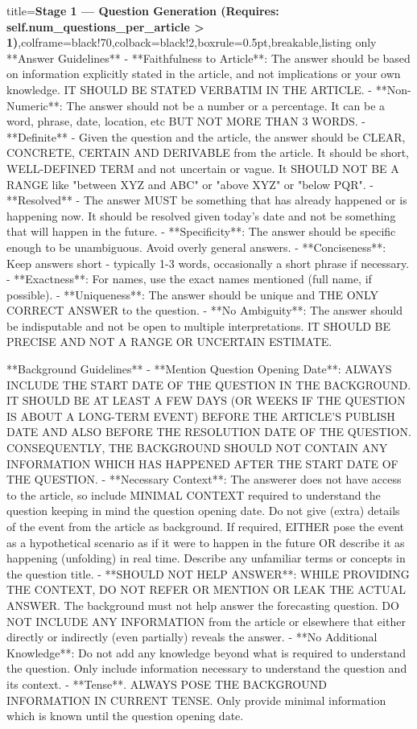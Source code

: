 \begin{tcblisting}{title={\textbf{Stage 1 --- Question Generation (Requires:  self.num\_questions\_per\_article > 1)}},colframe=black!70,colback=black!2,boxrule=0.5pt,breakable,listing only}
**Answer Guidelines**
- **Faithfulness to Article**: The answer should be based on information explicitly stated in the article, and not implications or your own knowledge. IT SHOULD BE STATED VERBATIM IN THE ARTICLE.
- **Non-Numeric**: The answer should not be a number or a percentage. It can be a word, phrase, date, location, etc BUT NOT MORE THAN 3 WORDS.
- **Definite** - Given the question and the article, the answer should be CLEAR, CONCRETE, CERTAIN AND DERIVABLE from the article. It should be short, WELL-DEFINED TERM and not uncertain or vague. It SHOULD NOT BE A RANGE like "between XYZ and ABC" or "above XYZ" or "below PQR".
- **Resolved** - The answer MUST be something that has already happened or is happening now. It should be resolved given today's date and not be something that will happen in the future.
- **Specificity**: The answer should be specific enough to be unambiguous. Avoid overly general answers.
- **Conciseness**: Keep answers short - typically 1-3 words, occasionally a short phrase if necessary.
- **Exactness**: For names, use the exact names mentioned (full name, if possible).
- **Uniqueness**: The answer should be unique and THE ONLY CORRECT ANSWER to the question. 
- **No Ambiguity**: The answer should be indisputable and not be open to multiple interpretations. IT SHOULD BE PRECISE AND NOT A RANGE OR UNCERTAIN ESTIMATE.

**Background Guidelines**
- **Mention Question Opening Date**: ALWAYS INCLUDE THE START DATE OF THE QUESTION IN THE BACKGROUND. IT SHOULD BE AT LEAST A FEW DAYS (OR WEEKS IF THE QUESTION IS ABOUT A LONG-TERM EVENT) BEFORE THE ARTICLE'S PUBLISH DATE AND ALSO BEFORE THE RESOLUTION DATE OF THE QUESTION. CONSEQUENTLY, THE BACKGROUND SHOULD NOT CONTAIN ANY INFORMATION WHICH HAS HAPPENED AFTER THE START DATE OF THE QUESTION.
- **Necessary Context**: The answerer does not have access to the article, so include MINIMAL CONTEXT required to understand the question keeping in mind the question opening date. Do not give (extra) details of the event from the article as background. If required, EITHER pose the event as a hypothetical scenario as if it were to happen in the future OR describe it as happening (unfolding) in real time. Describe any unfamiliar terms or concepts in the question title. 
- **SHOULD NOT HELP ANSWER**: WHILE PROVIDING THE CONTEXT, DO NOT REFER OR MENTION OR LEAK THE ACTUAL ANSWER. The background must not help answer the forecasting question. DO NOT INCLUDE ANY INFORMATION from the article or elsewhere that either directly or indirectly (even partially) reveals the answer.
- **No Additional Knowledge**: Do not add any knowledge beyond what is required to understand the question. Only include information necessary to understand the question and its context. 
- **Tense**. ALWAYS POSE THE BACKGROUND INFORMATION IN CURRENT TENSE. Only provide minimal information which is known until the question opening date.


\end{tcblisting}
